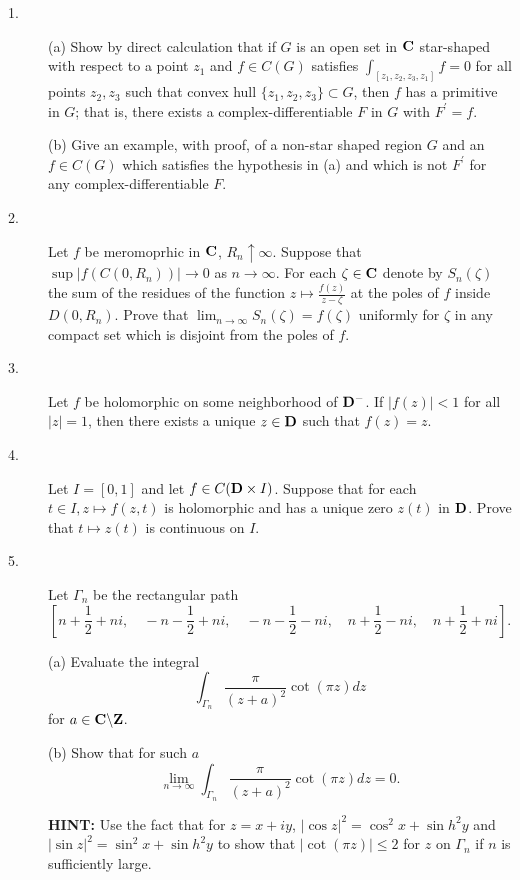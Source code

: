 \documentclass{article}
\begin{document}
\begin{description}
\item[1.] (a)
Show by direct calculation that if $G$ is an open set in ${\bf C}$ star-shaped
with respect to a point $z_1$ and $f \in C(G)$ satisfies
$\int_{[z_1, z_2, z_3, z_1]} f=0$ for all points $z_2, z_3$
such that convex hull $\{z_1, z_2, z_3\} \subset G$, then $f$ has a primitive
in $G$; that is, there exists a complex-differentiable $F$ in $G$ with
$F^\prime = f$.

\item[\quad] (b)
Give an example, with proof, of a non-star shaped region $G$ and an
$f \in C(G)$ which satisfies the hypothesis in (a) and which is not $F^\prime$
for any complex-differentiable $F$.

\item[2.]
Let $f$ be meromoprhic in ${\bf C}$, $R_n \uparrow \infty$. Suppose that
$\sup |f(C(0, R_n)) | \to 0$ as $n \to \infty$. For each $\zeta \in {\bf C}$ denote
by $S_n(\zeta)$ the sum of the residues of the function
$z \mapsto \frac{f(z)}{z-\zeta}$ at the poles of $f$ inside
$D(0, R_n)$. Prove that $\lim_{n \to \infty} S_n (\zeta) = f(\zeta)$
uniformly for $\zeta$ in any compact set which is disjoint from the poles of
$f$.

\item[3.]
Let $f$ be holomorphic on some neighborhood of ${\bf D}^-$. If $|f(z)| < 1$ for
all $|z| = 1$, then there exists a unique $z \in {\bf D}$ such that $f(z) = z$.

\item[4.]
Let $I = [0,1]$ and let $f \in C({\bf D} \times I)$. Suppose that for each
$t \in I, z \mapsto f(z,t)$ is holomorphic and has a unique zero $z(t)$ in
${\bf D}$. Prove that $t \mapsto z(t)$ is continuous on $I$.

\item[5.]
Let $\Gamma_n$ be the rectangular path
$$\left[ n + \frac{1}{2} + ni, \quad -n - \frac{1}{2} + ni, \quad
  -n - \frac{1}{2} - ni, \quad n + \frac{1}{2} - ni, \quad n + \frac{1}{2}
  +  ni \right].$$

\item[\quad] (a)
Evaluate the integral
$$\int_{\Gamma_n} \frac{\pi}{(z+a)^2} \cot (\pi z) dz$$
for $a \in {\bf C} \backslash {\bf Z}$.

\item[\quad] (b)
Show that for such $a$
$$\lim_{n \to \infty} \int_{\Gamma_n} \frac{\pi}{(z+a)^2} \cot (\pi z)
  dz = 0.$$

{\bf HINT:} Use the fact that for $z= x+ iy$,
$|\cos z|^2 = \cos^2 x + \sin h^2 y$ and $|\sin z|^2 = \sin^2 x + \sin h^2 y$
to show that $|\cot (\pi z) | \leq 2$ for $z$ on $\Gamma_n$ if $n$ is
sufficiently large.


\end{description}
\end{document}
